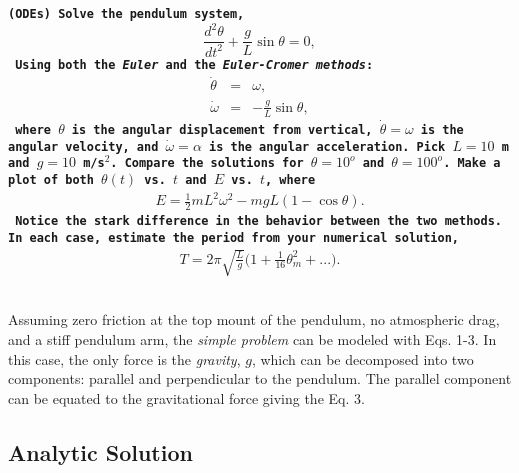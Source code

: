 \documentclass[12pt]{article}
\author{\color{purple}{\bf Marina von Steinkirch}}
\title{\color{red}{\bf PHYS 688: Numerical Methods for AstroPhysics \\Homework \#2: ODEs} }
\newcounter{question}[section]
\newcommand{\question}[2] {\vspace{.25in} \fbox{#1} #2 \vspace{.10in}}
\begin{document}
\maketitle



{\color{MidnightBlue}
\question{Q.1}{\texttt{{\bf(ODEs)} {\bf Solve the pendulum system, 
$$\frac{d^2\theta}{dt^2} + \frac{g}{L} \sin \theta = 0,$$
Using both the {\it Euler} and the {\it Euler-Cromer methods}:
\begin{eqnarray}
 \dot \theta &=& \omega, \\
 \dot \omega &=& -\frac{g}{L} \sin \theta,
\label{pen1}
\end{eqnarray}
where $\theta$ is the angular displacement from vertical, $\dot \theta = \omega$ is the angular velocity, and $\dot \omega = \alpha$ is the angular acceleration. Pick $L = 10$ m and $g = 10$ m/s$^2$. Compare the solutions for $\theta = 10^o$ and $\theta =100^o$. Make a plot of both $\theta (t)$ vs. $t$ and $E$ vs. $t$, where
\begin{eqnarray}
E = \frac{1}{2} m L^2 \omega^2 - mgL (1 - \cos \theta).
\label{E}
\end{eqnarray}
 Notice the stark difference in the behavior between the two methods. In each case, estimate the period from your numerical solution,
\begin{eqnarray}
T = 2 \pi \sqrt{\frac{L}{g}} \Bigg ( 1 + \frac{1}{16}\theta^2_m + ... \Bigg).
\label{T}
\end{eqnarray}
 }}}}

\quad


Assuming zero friction at the top mount of the pendulum, no atmospheric drag, and a stiff pendulum arm, the {\it simple problem} can be modeled with Eqs. 1-3. In this case, the only force is the {\it gravity}, $g$, which can be decomposed into two components:  parallel and  perpendicular to the pendulum.  The parallel component can be equated to the  gravitational force giving the Eq. 3. 

\quad

\subsection*{Analytic Solution}
\end{document}

